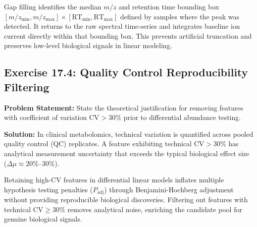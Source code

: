 \documentclass[11pt,twoside,openright]{book}
\begin{document}
Gap filling identifies the median $m/z$ and retention time bounding box $[m/z_{\min}, m/z_{\max}] \times [\text{RT}_{\min}, \text{RT}_{\max}]$ defined by samples where the peak was detected. It returns to the raw spectral time-series and integrates baseline ion current directly within that bounding box. This prevents artificial truncation and preserves low-level biological signals in linear modeling.

\subsection*{Exercise 17.4: Quality Control Reproducibility Filtering}
\noindent\textbf{Problem Statement:}\enspace
State the theoretical justification for removing features with coefficient of variation $\text{CV} > 30\%$ prior to differential abundance testing.

\noindent\textbf{Solution:}\enspace
In clinical metabolomics, technical variation is quantified across pooled quality control (QC) replicates. A feature exhibiting technical $\text{CV} > 30\%$ has analytical measurement uncertainty that exceeds the typical biological effect size ($\Delta \mu \approx 20\%$--$30\%$). 

Retaining high-CV features in differential linear models inflates multiple hypothesis testing penalties ($P_{\text{adj}}$) through Benjamini-Hochberg adjustment without providing reproducible biological discoveries. Filtering out features with technical $\text{CV} \ge 30\%$ removes analytical noise, enriching the candidate pool for genuine biological signals.
\end{document}
